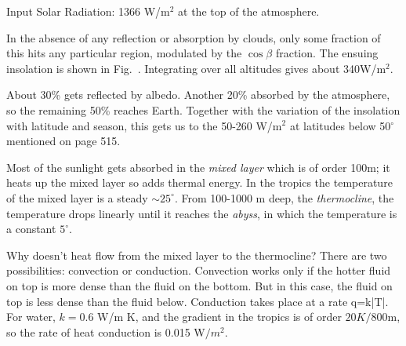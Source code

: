 \documentclass[11pt]{book}
\begin{document}


\bei
\item Input Solar Radiation: 1366 W/m$^2$ at the top of the atmosphere.
\item In the absence of any reflection or absorption by clouds, only some fraction of this hits any particular region, modulated by the $\cos\beta$ fraction. The ensuing insolation is shown in Fig.~. Integrating over all altitudes gives about 340W/m$^2$. 
\item About 30\% gets reflected by albedo. Another 20\% absorbed by the atmosphere, so the remaining 50\% reaches Earth. Together with the variation of the insolation with latitude and season, this gets us to the 50-260 W/m$^2$ at latitudes below 50$^\circ$ mentioned on page 515.
\item Most of the sunlight gets absorbed in the {\it mixed layer} which is of order 100m; it heats up the mixed layer so adds thermal energy. In the tropics the temperature of the mixed layer is a steady $\sim25^\circ$. From 100-1000 m deep, the {\it thermocline}, the temperature drops linearly until it reaches the {\it abyss}, in which the temperature is a constant $5^\circ$.
\item Why doesn't heat flow from the mixed layer to the thermocline? There are two possibilities: convection or conduction. Convection works only if the hotter fluid on top is more dense than the fluid on the bottom. But in this case, the fluid on top is less dense than the fluid below. Conduction takes place at a rate
\be
q=k|\nabla T|.\ee
For water, $k=0.6$ W/m K, and the gradient in the tropics is of order $20 K/800$m, so the rate of heat conduction is 0.015 W$/m^2$. 
\eei
\end{document}
